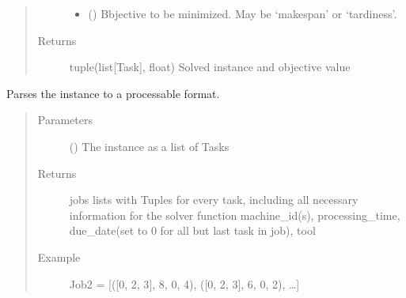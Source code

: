 \documentclass[letterpaper,10pt,english]{sphinxmanual}
\begin{document}
\begin{fulllineitems}
\begin{fulllineitems}
\begin{quote}
\begin{description}
\begin{itemize}
\item {} 
\sphinxAtStartPar
{} () \textendash{} Bbjective to be minimized. May be ‘makespan’ or ‘tardiness’.

\end{itemize}

\item[{Returns}] \leavevmode
\sphinxAtStartPar
tuple(list{[}Task{]}, float) Solved instance and objective value

\end{description}\end{quote}

\end{fulllineitems}


\begin{fulllineitems}
\label{\detokenize{agents.solver:agents.solver.solver.OrToolSolver.parse_instance_to_solver_format}}
\sphinxAtStartPar
Parses the instance to a processable format.
\begin{quote}\begin{description}
\item[{Parameters}] \leavevmode
\sphinxAtStartPar
{} (\sphinxstyleliteralemphasis{\sphinxupquote{{[}}}{\hyperref[\detokenize{data_generator:data_generator.task.Task}]{\sphinxcrossref{\sphinxstyleliteralemphasis{\sphinxupquote{Task}}}}}\sphinxstyleliteralemphasis{\sphinxupquote{{]}}}) \textendash{} The instance as a list of Tasks

\item[{Returns}] \leavevmode
\sphinxAtStartPar
jobs lists with Tuples for every task, including all necessary information for the solver function
machine\_id(s), processing\_time, due\_date(set to 0 for all but last task in job), tool

\item[{Example}] \leavevmode
\sphinxAtStartPar
Job2 = {[}({[}0, 2, 3{]}, 8, 0, 4), ({[}0, 2, 3{]}, 6, 0, 2), …{]}


\end{description}
\end{quote}
\end{fulllineitems}
\end{fulllineitems}
\end{document}
